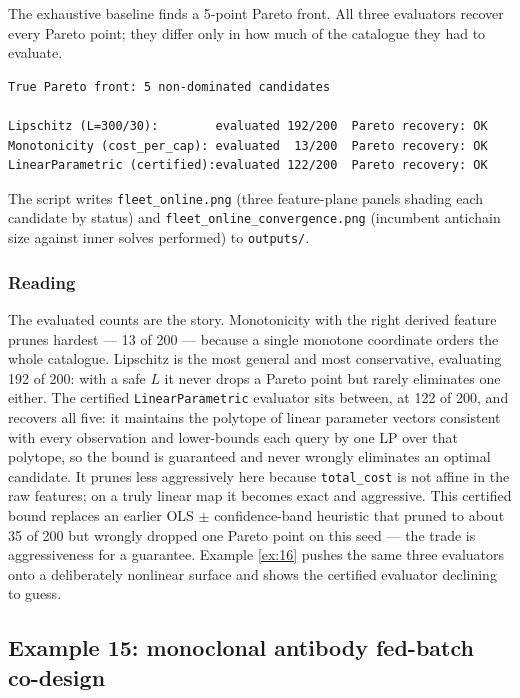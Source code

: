 \documentclass[11pt,a4paper]{article}
\begin{document}
The exhaustive baseline finds a 5-point Pareto front. All three
evaluators recover every Pareto point; they differ only in how much of
the catalogue they had to evaluate.

\begin{lstlisting}[language={},numbers=none,keywordstyle={}]
True Pareto front: 5 non-dominated candidates

Lipschitz (L=300/30):        evaluated 192/200  Pareto recovery: OK
Monotonicity (cost_per_cap): evaluated  13/200  Pareto recovery: OK
LinearParametric (certified):evaluated 122/200  Pareto recovery: OK
\end{lstlisting}

The script writes \texttt{fleet\_online.png} (three feature-plane
panels shading each candidate by status) and
\texttt{fleet\_online\_convergence.png} (incumbent antichain size
against inner solves performed) to \texttt{outputs/}.

\subsubsection*{Reading}

The evaluated counts are the story. Monotonicity with the right derived
feature prunes hardest --- 13 of 200 --- because a single monotone
coordinate orders the whole catalogue. Lipschitz is the most general
and most conservative, evaluating 192 of 200: with a safe $L$ it never
drops a Pareto point but rarely eliminates one either. The certified
\texttt{LinearParametric} evaluator sits between, at 122 of 200, and
recovers all five: it maintains the polytope of linear parameter
vectors consistent with every observation and lower-bounds each query
by one LP over that polytope, so the bound is guaranteed and never
wrongly eliminates an optimal candidate. It prunes less aggressively
here because \texttt{total\_cost} is not affine in the raw features; on
a truly linear map it becomes exact and aggressive. This certified
bound replaces an earlier OLS $\pm$ confidence-band heuristic that
pruned to about 35 of 200 but wrongly dropped one Pareto point on this
seed --- the trade is aggressiveness for a guarantee. Example
\ref{ex:16} pushes the same three evaluators onto a deliberately
nonlinear surface and shows the certified evaluator declining to guess.

\subsection{Example 15: monoclonal antibody fed-batch co-design}
\label{ex:15}
\end{document}
